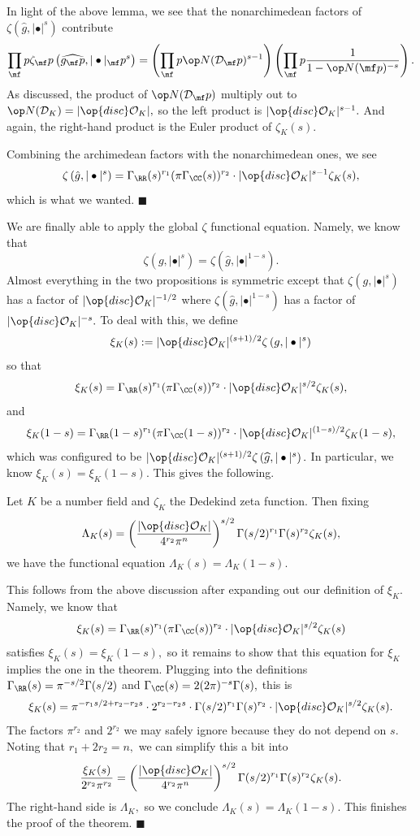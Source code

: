 In light of the above lemma, we see that the nonarchimedean factors of $\zeta\left(\hat g,|\bullet|^s\right)$ contribute
\[\prod_\mf p\zeta_\mf p\left(\widehat{g_\mf p},|\bullet|_\mf p^s\right)=\left(\prod_\mf p\op N(\mathcal D_\mf p)^{s-1}\right)\left(\prod_\mf p\frac1{1-\op N(\mf p)^{-s}}\right).\]
As discussed, the product of $\op N(\mathcal D_\mf p)$ multiply out to $\op N(\mathcal D_K)=|\op{disc}\mathcal O_K|,$ so the left product is $|\op{disc}\mathcal O_K|^{s-1}.$ And again, the right-hand product is the Euler product of $\zeta_K(s).$

Combining the archimedean factors with the nonarchimedean ones, we see
\[\zeta\left(\hat g,|\bullet|^s\right)=\Gamma_\RR(s)^{r_1}(\pi\Gamma_\CC(s))^{r_2}\cdot|\op{disc}\mathcal O_K|^{s-1}\zeta_K(s),\]
which is what we wanted. $\blacksquare$

We are finally able to apply the global $\zeta$ functional equation. Namely, we know that
\[\zeta\left(g,|\bullet|^s\right)=\zeta\left(\hat g,|\bullet|^{1-s}\right).\]
Almost everything in the two propositions is symmetric except that $\zeta\left(g,|\bullet|^s\right)$ has a factor of $|\op{disc}\mathcal O_K|^{-1/2}$ where $\zeta\left(\widehat g,|\bullet|^{1-s}\right)$ has a factor of $|\op{disc}\mathcal O_K|^{-s}.$ To deal with this, we define
\[\xi_K(s):=|\op{disc}\mathcal O_K|^{(s+1)/2}\zeta\left(g,|\bullet|^s\right)\]
so that
\[\xi_K(s)=\Gamma_\RR(s)^{r_1}(\pi\Gamma_\CC(s))^{r_2}\cdot|\op{disc}\mathcal O_K|^{s/2}\zeta_K(s),\]
and
\[\xi_K(1-s)=\Gamma_\RR(1-s)^{r_1}(\pi\Gamma_\CC(1-s))^{r_2}\cdot|\op{disc}\mathcal O_K|^{(1-s)/2}\zeta_K(1-s),\]
which was configured to be $|\op{disc}\mathcal O_K|^{(s+1)/2}\zeta\left(\widehat g,|\bullet|^s\right).$ In particular, we know $\xi_K(s)=\xi_K(1-s).$ This gives the following.
\begin{theorem}
    Let $K$ be a number field and $\zeta_K$ the Dedekind zeta function. Then fixing
    \[\Lambda_K(s)=\left(\frac{|\op{disc}\mathcal O_K|}{4^{r_2}\pi^n}\right)^{s/2}\Gamma(s/2)^{r_1}\Gamma(s)^{r_2}\zeta_K(s),\]
    we have the functional equation $\Lambda_K(s)=\Lambda_K(1-s).$
\end{theorem}
This follows from the above discussion after expanding out our definition of $\xi_K.$ Namely, we know that
\[\xi_K(s)=\Gamma_\RR(s)^{r_1}(\pi\Gamma_\CC(s))^{r_2}\cdot|\op{disc}\mathcal O_K|^{s/2}\zeta_K(s)\]
satisfies $\xi_K(s)=\xi_K(1-s),$ so it remains to show that this equation for $\xi_K$ implies the one in the theorem. Plugging into the definitions $\Gamma_\RR(s)=\pi^{-s/2}\Gamma(s/2)$ and $\Gamma_\CC(s)=2(2\pi)^{-s}\Gamma(s),$ this is
\[\xi_K(s)=\pi^{-r_1s/2+r_2-r_2s}\cdot2^{r_2-r_2s}\cdot\Gamma(s/2)^{r_1}\Gamma(s)^{r_2}\cdot|\op{disc}\mathcal O_K|^{s/2}\zeta_K(s).\]
The factors $\pi^{r_2}$ and $2^{r_2}$ we may safely ignore because they do not depend on $s.$ Noting that $r_1+2r_2=n,$ we can simplify this a bit into
\[\frac{\xi_K(s)}{2^{r_2}\pi^{r_2}}=\left(\frac{|\op{disc}\mathcal O_K|}{4^{r_2}\pi^n}\right)^{s/2}\Gamma(s/2)^{r_1}\Gamma(s)^{r_2}\zeta_K(s).\]
The right-hand side is $\Lambda_K,$ so we conclude $\Lambda_K(s)=\Lambda_K(1-s).$ This finishes the proof of the theorem. $\blacksquare$

